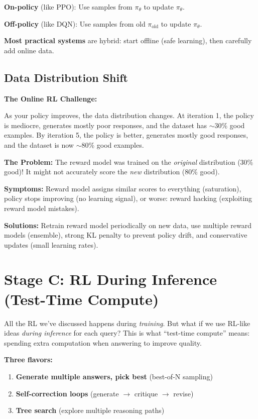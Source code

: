 \begin{chapterenv}
\begin{infobox}
\textbf{On-policy} (like PPO): Use samples from $\pi_\theta$ to update $\pi_\theta$.

\textbf{Off-policy} (like DQN): Use samples from old $\pi_{\text{old}}$ to update $\pi_\theta$.

\textbf{Most practical systems} are hybrid: start offline (safe learning), then carefully add online data.
\end{infobox}

\subsection{Data Distribution Shift}

\begin{infobox}
\textbf{The Online RL Challenge:}

As your policy improves, the data distribution changes. At iteration 1, the policy is mediocre, generates mostly poor responses, and the dataset has $\sim$30\% good examples. By iteration 5, the policy is better, generates mostly good responses, and the dataset is now $\sim$80\% good examples.

\textbf{The Problem:} The reward model was trained on the \textit{original} distribution (30\% good)! It might not accurately score the \textit{new} distribution (80\% good).

\textbf{Symptoms:} Reward model assigns similar scores to everything (saturation), policy stops improving (no learning signal), or worse: reward hacking (exploiting reward model mistakes).

\textbf{Solutions:} Retrain reward model periodically on new data, use multiple reward models (ensemble), strong KL penalty to prevent policy drift, and conservative updates (small learning rates).
\end{infobox}

\section{Stage C: RL During Inference (Test-Time Compute)}

All the RL we've discussed happens during \textit{training}. But what if we use RL-like ideas \textit{during inference} for each query? This is what ``test-time compute'' means: spending extra computation when answering to improve quality.

\textbf{Three flavors:}
\begin{enumerate}[nosep]
    \item \textbf{Generate multiple answers, pick best} (best-of-N sampling)
    \item \textbf{Self-correction loops} (generate $\to$ critique $\to$ revise)
    \item \textbf{Tree search} (explore multiple reasoning paths)
\end{enumerate}


\end{chapterenv}
